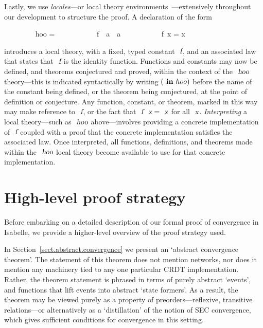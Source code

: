 \documentclass[acmlarge,review,anonymous]{acmart}\settopmatter{printfolios=true}
\begin{document}
Lastly, we use \emph{locales}---or local theory environments~\cite{DBLP:conf/tphol/KammullerWP99,DBLP:conf/types/HaftmannW08}---extensively throughout our development to structure the proof.
A declaration of the form
\\
\begin{isabellebody}
\ \ \ \ \ \ \ \  hoo = \isanewline
\ \ \ \ \ \ \ \ \ \ \ f\ {\isacharcolon}{\isacharcolon}\ {\isachardoublequoteopen}{\isacharprime}a\ {\isasymRightarrow}\ {\isacharprime}a{\isachardoublequoteclose}\isanewline
\ \ \ \ \ \ \ \ \ \  {\isachardoublequoteopen}f\ x = x{\isachardoublequoteclose}
\end{isabellebody}
\vspace{\baselineskip}
\noindent
introduces a local theory, with a fixed, typed constant $\isa{f}$, and an associated law that states that $\isa{f}$ is the identity function.
Functions and constants may now be defined, and theorems conjectured and proved, within the context of the $\isa{hoo}$ theory---this is indicated syntactically by writing $(\isacommand{in}\ hoo)$ before the name of the constant being defined, or the theorem being conjectured, at the point of definition or conjecture.
Any function, constant, or theorem, marked in this way may make reference to $\isa{f}$, or the fact that $\isa{f}\ \isa{x} = \isa{x}$ for all $\isa{x}$.
\emph{Interpreting} a local theory---such as $\isa{hoo}$ above---involves providing a concrete implementation of $\isa{f}$ coupled with a proof that the concrete implementation satisfies the associated law.
Once interpreted, all functions, definitions, and theorems made within the $\isa{hoo}$ local theory become available to use for that concrete implementation.





\section{High-level proof strategy}
\label{sect.high-level.proof.strategy}

Before embarking on a detailed description of our formal proof of convergence in Isabelle, we provide a higher-level overview of the proof strategy used.

In Section~\ref{sect.abstract.convergence} we present an `abstract convergence theorem'.
The statement of this theorem does not mention networks, nor does it mention any machinery tied to any one particular CRDT implementation. 
Rather, the theorem statement is phrased in terms of purely abstract `events', and functions that lift events into abstract `state formers'.
As a result, the theorem may be viewed purely as a property of preorders---reflexive, transitive relations---or alternatively as a `distillation' of the notion of SEC convergence, which gives sufficient conditions for convergence in this setting.
\end{document}
